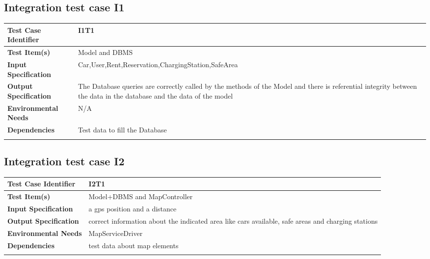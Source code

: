 \subsection{Integration test case I1}
\begin{center}
\begin{tabular*}
{\textwidth}
{l p{10.5cm}}

\hline
\textbf{Test Case Identifier} & I1T1 \\
\hline
\textbf{Test Item(s)} &  Model and DBMS\\
\hline
\textbf{Input Specification} & Car,User,Rent,Reservation,ChargingStation,SafeArea\\
\hline
\textbf{Output Specification} & The Database queries are correctly called by the methods of the Model and there is referential integrity between the data in the database and the data of the model\\
\hline
\textbf{Environmental Needs} & N/A\\
\hline
\textbf{Dependencies} & Test data to fill the Database\\
\hline
\newline
\newline
\end{tabular*}
\end{center}




\subsection{Integration test case I2}
\begin{center}
\begin{tabular*}
{\textwidth}
{l p{10.5cm}}
\hline
\textbf{Test Case Identifier} & I2T1 \\
\hline
\textbf{Test Item(s)} &  Model+DBMS and MapController  \\
\hline
\textbf{Input Specification} &  a gps position and a distance\\
\hline
\textbf{Output Specification} &  correct information about the indicated area like cars available, safe areas and charging stations\\
\hline
\textbf{Environmental Needs} & MapServiceDriver \\
\hline
\textbf{Dependencies} &  test data about map elements \\
\hline
\newline
\newline
\end{tabular*}
\end{center}

